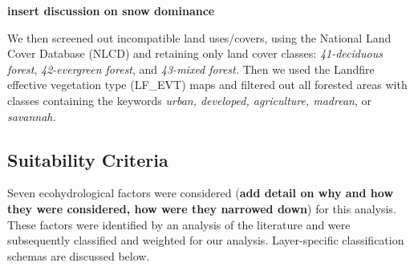 \documentclass[
  number,
  preprint,
  3p,
  onecolumn]{elsarticle}
\begin{document}
\textbf{insert discussion on snow dominance}

We then screened out incompatible land uses/covers, using the National
Land Cover Database (NLCD) and retaining only land cover classes:
\emph{41-deciduous forest}, \emph{42-evergreen forest}, and
\emph{43-mixed forest.} Then we used the Landfire effective vegetation
type (LF\_EVT) maps and filtered out all forested areas with classes
containing the keywords \emph{urban, developed, agriculture, madrean},
or \emph{savannah.}

\subsection{Suitability Criteria}\label{suitability-criteria}

Seven ecohydrological factors were considered (\textbf{add detail on why
and how they were considered, how were they narrowed down}) for this
analysis. These factors were identified by an analysis of the literature
and were subsequently classified and weighted for our analysis.
Layer-specific classification schemas are discussed below.
\end{document}
